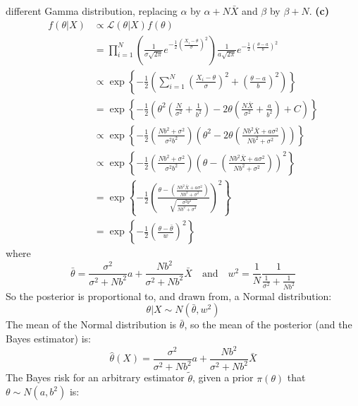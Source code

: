 different Gamma distribution, replacing \(\alpha\) by
\(\alpha + N \bar{X}\) and \(\beta\) by \(\beta + N\).
\textbf{(c)}
\begin{align*}
f(\theta | X) &\propto \mathcal{L}(\theta | X) f(\theta) 
\\
&= \prod_{i = 1}^N \left( \frac{1}{\sigma \sqrt{2 \pi}} e^{-\frac{1}{2} \left(\frac{X_{i} - \theta}{\sigma} \right)^{2}} \right) \frac{1}{a \sqrt{2 \pi}} e^{-\frac{1}{2} \left( \frac{\theta - a}{b}\right)^{2}} 
\\
& \propto \exp \left\{ -\frac{1}{2} \left( \sum_{i=1}^N \left( \frac{X_{i} - \theta}{\sigma}\right)^{2} + \left( \frac{\theta - a}{b}\right)^{2} \right) \right\} 
\\
& = \exp \left\{-\frac{1}{2} \left( \theta^{2} \left(\frac{N}{\sigma^{2}} + \frac{1}{b^{2}} \right) - 2 \theta \left( \frac{N \bar{X}}{\sigma^{2}} + \frac{a}{b^{2}} \right) + C\right) \right\} 
\\
& \propto \exp \left\{-\frac{1}{2} \left( \frac{Nb^{2} + \sigma^{2}}{\sigma^{2} b^{2}} \right)\left(\theta^{2} - 2\theta \left(\frac{N b^{2} \bar{X} + a \sigma^{2}}{N b^{2} + \sigma^{2}} \right) \right) \right\} 
\\
& \propto \exp \left\{-\frac{1}{2} \left( \frac{Nb^{2} + \sigma^{2}}{\sigma^{2} b^{2}} \right) \left(\theta - \left(\frac{N b^{2} \bar{X} + a \sigma^{2}}{N b^{2} + \sigma^{2}} \right) \right)^{2} \right\} 
\\
& = \exp \left\{-\frac{1}{2} \left(\frac{\theta - \left(\frac{N b^{2} \bar{X} + a \sigma^{2}}{N b^{2} + \sigma^{2}} \right)}{\sqrt{\frac{\sigma^{2} b^{2}}{Nb^{2} + \sigma^{2}}}} \right)^{2} \right\} 
\\
& = \exp \left\{-\frac{1}{2} \left(\frac{\theta - \bar{\theta}}{w} \right)^{2} \right\}
\end{align*}
where
\[
\bar{\theta} = \frac{\sigma^{2}}{\sigma^{2} + N b^{2}}a + \frac{Nb^{2}}{\sigma^{2} + Nb^{2}}\bar{X}
\quad \text{and} \quad
w^{2} = \frac{1}{N} \frac{1}{\frac{1}{\sigma^{2}} + \frac{1}{Nb^{2}}}
\]
So the posterior is proportional to, and drawn from, a Normal
distribution:
\[
\theta | X \sim N(\bar{\theta}, w^{2})
\]
The mean of the Normal distribution is \(\bar{\theta}\), so the
mean of the posterior (and the Bayes estimator) is:
\[
\hat{\theta}(X) = \frac{\sigma^{2}}{\sigma^{2} + N b^{2}}a + \frac{Nb^{2}}{\sigma^{2} + Nb^{2}}\bar{X}
\]
The Bayes risk for an arbitrary estimator \(\tilde{\theta}\), given a
prior \(\pi(\theta)\) that \(\theta \sim N(a, b^{2})\) is:
